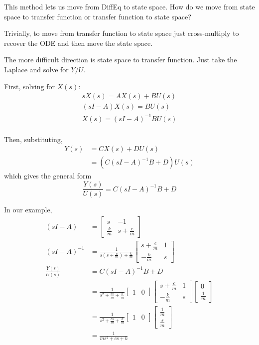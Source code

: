 \documentclass[12pt]{article}
\begin{document}
This method lets us move from DiffEq to state space. How do we move from state space to transfer function or transfer function to state space?

Trivially, to move from transfer function to state space just cross-multiply to recover the ODE and then move the state space. 

The more difficult direction is state space to transfer function. Just take the Laplace and solve for $Y/U$.

First, solving for $X(s)$:
\begin{gather*}
     s X(s) = AX(s) + BU(s)\\ 
    (sI - A)X(s) = BU(s)\\ 
    X(s) = (sI-A)^{-1} BU(s)\\ 
\end{gather*}

Then, substituting, 
\begin{align*}
    Y(s) &= CX(s) + DU(s)\\ 
    &= (C(sI - A)^{-1} B + D)U(s)
\end{align*}
which gives the general form 
\[\boxed{\frac{Y(s)}{U(s)} = C(sI - A)^{-1} B + D}\]

In our example, 
\begin{align*}
    (sI - A) &= \begin{bmatrix}
        s & -1\\ 
        \frac{k}{m} & s + \frac{c}{m}
    \end{bmatrix}\\ 
    (sI- A)^{-1} &= \frac{1}{s(s + \frac{c}{m}) + \frac{k}{m}} \begin{bmatrix}
        s + \frac{c}{m} & 1\\ 
        -\frac{k}{m} & s
    \end{bmatrix}\\ 
    \frac{Y(s)}{U(s)} &=  C(sI - A)^{-1} B + D\\ 
    &=  \frac{1}{s^2 + \frac{cs}{m} + \frac{k}{m}} \begin{bmatrix}
        1 & 0
    \end{bmatrix}\begin{bmatrix}
        s + \frac{c}{m} & 1\\ 
        -\frac{k}{m} & s
    \end{bmatrix} \begin{bmatrix}
        0 \\ \frac{1}{m}
    \end{bmatrix}\\ 
    &=  \frac{1}{s^2 + \frac{cs}{m} + \frac{k}{m}} \begin{bmatrix}
        1 & 0
    \end{bmatrix} \begin{bmatrix}
        \frac{1}{m} \\ \frac{s}{m}
    \end{bmatrix}\\ 
    &=   \frac{1}{ms^2 + cs + k} 
\end{align*}
\end{document}
